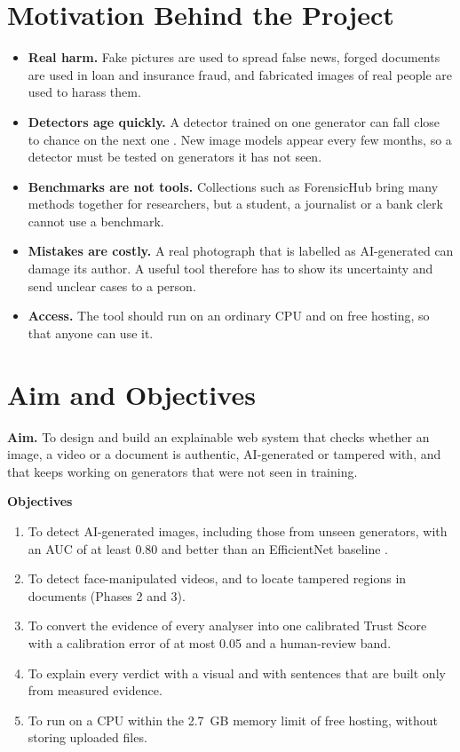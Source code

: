 \section{Motivation Behind the Project}
\begin{itemize}
  \item \textbf{Real harm.} Fake pictures are used to spread false news, forged documents are used in loan and insurance fraud, and fabricated images of real people are used to harass them.
  \item \textbf{Detectors age quickly.} A detector trained on one generator can fall close to chance on the next one \cite{ojha,wang}. New image models appear every few months, so a detector must be tested on generators it has not seen.
  \item \textbf{Benchmarks are not tools.} Collections such as ForensicHub \cite{forensichub} bring many methods together for researchers, but a student, a journalist or a bank clerk cannot use a benchmark.
  \item \textbf{Mistakes are costly.} A real photograph that is labelled as AI-generated can damage its author. A useful tool therefore has to show its uncertainty and send unclear cases to a person.
  \item \textbf{Access.} The tool should run on an ordinary CPU and on free hosting, so that anyone can use it.
\end{itemize}

\section{Aim and Objectives}
\textbf{Aim.} To design and build an explainable web system that checks whether an image, a video or a document is authentic, AI-generated or tampered with, and that keeps working on generators that were not seen in training.

\textbf{Objectives}
\begin{enumerate}
  \item To detect AI-generated images, including those from unseen generators, with an AUC of at least 0.80 and better than an EfficientNet baseline \cite{effnet}.
  \item To detect face-manipulated videos, and to locate tampered regions in documents (Phases 2 and 3).
  \item To convert the evidence of every analyser into one calibrated Trust Score with a calibration error of at most 0.05 and a human-review band.
  \item To explain every verdict with a visual and with sentences that are built only from measured evidence.
  \item To run on a CPU within the 2.7~GB memory limit of free hosting, without storing uploaded files.
\end{enumerate}

